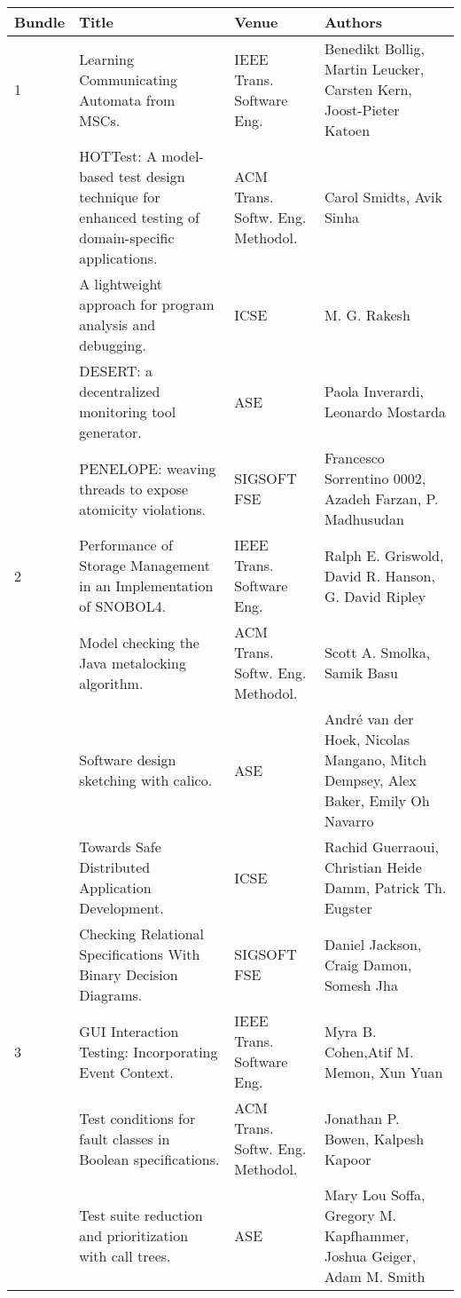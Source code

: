 \begin{center}
\begin{longtable}{|p{}p{}p{}p{}|}
    \hline
    Bundle & Title & Venue & Authors \\
    \hline
\rowcolor{black!20} 1 & Learning Communicating Automata from MSCs.& IEEE Trans. Software Eng.& 
Benedikt Bollig, Martin Leucker, Carsten Kern, Joost-Pieter Katoen \\
 & HOTTest: A model-based test design technique for enhanced testing of domain-specific 
applications.& ACM Trans. Softw. Eng. Methodol.& Carol Smidts, Avik Sinha \\
\rowcolor{black!20} & A lightweight approach for program analysis and debugging.& ICSE& M. G. Rakesh 
\\
 & DESERT: a decentralized monitoring tool generator.& ASE& Paola Inverardi, Leonardo Mostarda \\
\rowcolor{black!20} & PENELOPE: weaving threads to expose atomicity violations.& SIGSOFT FSE& 
Francesco Sorrentino 0002, Azadeh Farzan, P. Madhusudan \\
2 & Performance of Storage Management in an Implementation of SNOBOL4.& IEEE Trans. Software Eng.& 
Ralph E. Griswold, David R. Hanson, G. David Ripley \\
\rowcolor{black!20} & Model checking the Java metalocking algorithm.& ACM Trans. Softw. Eng. 
Methodol.& Scott A. Smolka, Samik Basu \\
 & Software design sketching with calico.& ASE& André van der Hoek, Nicolas Mangano, Mitch Dempsey, 
Alex Baker, Emily Oh Navarro \\
\rowcolor{black!20} & Towards Safe Distributed Application Development.& ICSE& Rachid Guerraoui, 
Christian Heide Damm, Patrick Th. Eugster \\
 & Checking Relational Specifications With Binary Decision Diagrams.& SIGSOFT FSE& Daniel Jackson, 
Craig Damon, Somesh Jha \\
\rowcolor{black!20} 3 & GUI Interaction Testing: Incorporating Event Context.& IEEE Trans. Software 
Eng.& Myra B. Cohen,Atif M. Memon, Xun Yuan \\
 & Test conditions for fault classes in Boolean specifications.& ACM Trans. Softw. Eng. Methodol.& 
Jonathan P. Bowen, Kalpesh Kapoor \\
\rowcolor{black!20} & Test suite reduction and prioritization with call trees.& ASE& Mary Lou Soffa, 
Gregory M. Kapfhammer, Joshua Geiger, Adam M. Smith \\

\end{longtable}
\end{center}
